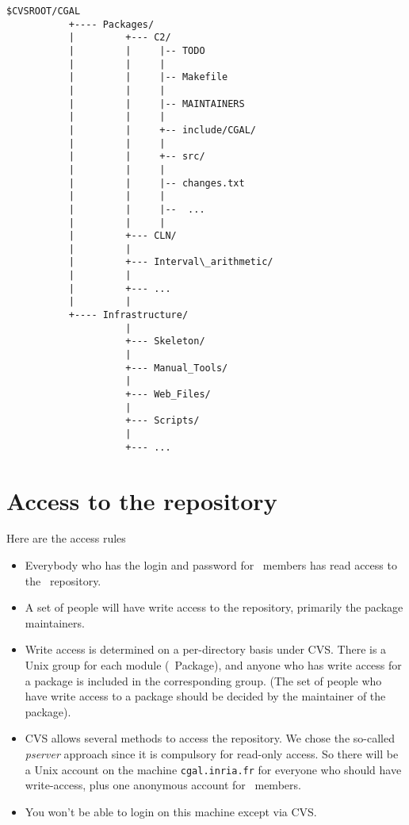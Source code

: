 \begin{verbatim}
$CVSROOT/CGAL
           +---- Packages/ 
           |         +--- C2/  
           |         |     |-- TODO 
           |         |     |
           |         |     |-- Makefile 
           |         |     |
           |         |     |-- MAINTAINERS 
           |         |     |
           |         |     +-- include/CGAL/ 
           |         |     |
           |         |     +-- src/ 
           |         |     |
           |         |     |-- changes.txt 
           |         |     |
           |         |     |--  ... 
           |         |     |
           |         +--- CLN/  
           |         |     
           |         +--- Interval\_arithmetic/ 
           |         |     
           |         +--- ...  
           |         |     
           +---- Infrastructure/ 
                     |     
                     +--- Skeleton/ 
                     |     
                     +--- Manual_Tools/ 
                     |     
                     +--- Web_Files/  
                     |     
                     +--- Scripts/  
                     |     
                     +--- ...  
\end{verbatim}


\section{Access to the repository}
\label{sec:cvs_access}

Here are the access rules
\begin{itemize}
\item Everybody who has the login and password for \cgal\ members 
      has read access to the \cgal\ repository.
\item A set of people will have write access to the repository, primarily the
      package maintainers.
\item Write access is determined on a per-directory basis under CVS.
      There is a Unix group for each module (\cgal\ Package), 
      and anyone who has write access for a package is included
      in the corresponding group. (The set of people who have write access
      to a package should be decided by the maintainer of the package).
\item CVS allows several methods to access the repository.  We chose the 
      so-called \textit{pserver} approach since it is compulsory for read-only
      access.  So there will be a Unix account on the machine 
      \texttt{cgal.inria.fr} for everyone who
     should have write-access, plus one anonymous account 
     for \cgal\ members.
\item You won't be able to login on this machine except via CVS.
\end{itemize}


